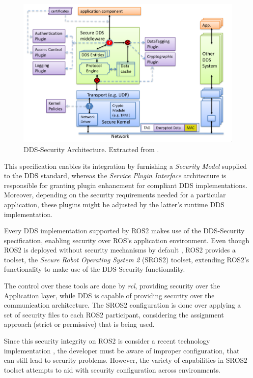 \begin{figure}[H]
    \centering
    \includegraphics[width=0.7\linewidth]{images/dds-security-architecture.png}
    \caption{DDS-Security Architecture. Extracted from \cite{dds-s}.}
    \label{fig:dds-security-architecture}
\end{figure}

This specification enables its integration by furnishing a \textit{Security Model} supplied to the DDS standard, whereas the \textit{Service Plugin Interface} architecture is responsible for granting plugin enhancment for compliant DDS implementations. Moreover, depending on the security requirements needed for a particular application, these plugins might be adjusted by the latter's runtime DDS implementation. \cite{dds-s}

Every DDS implementation supported by ROS2 makes use of the DDS-Security specification, enabling security over ROS's application environment. Even though ROS2 is deployed without security mechanisms by default \cite{ros-dds-integration}, ROS2 provides a toolset, the \textit{Secure Robot Operating System 2} (SROS2) toolset, extending ROS2's functionality to make use of the DDS-Security functionality. 

The control over these tools are done by \textit{rcl}, providing security over the Application layer, while DDS is capable of providing security over the communication architecture. \cite{kim2018security} The SROS2 configuration is done over applying a set of security files to each ROS2 participant, considering the assignment approach (strict or permissive) that is being used.

Since this security integrity on ROS2 is consider a recent technology implementation \cite{ros-dds-integration}, the developer must be aware of improper configuration, that can still lead to security problems. However, the variety of capabilities in SROS2 toolset attempts to aid with security configuration across environments. 

